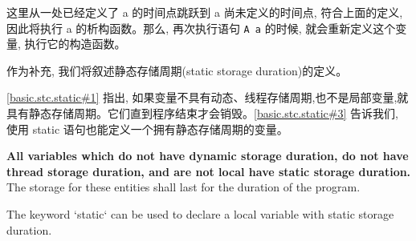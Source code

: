 \documentclass{article}
\begin{document}
	这里从一处已经定义了 a 的时间点跳跃到 a 尚未定义的时间点, 符合上面的定义, 因此将执行 a 的析构函数。那么, 再次执行语句 \verb|A a| 的时候, 就会重新定义这个变量, 执行它的构造函数。

	作为补充, 我们将叙述静态存储周期(static storage duration)的定义。
	
	\href{https://timsong-cpp.github.io/cppwp/n4659/basic.stc.static#1}	{[basic.stc.static\#1]} 指出, 如果变量不具有动态、线程存储周期,也不是局部变量,就具有静态存储周期。它们直到程序结束才会销毁。\href{https://timsong-cpp.github.io/cppwp/n4659/basic.stc.static#3}	{[basic.stc.static\#3]} 告诉我们, 使用 static 语句也能定义一个拥有静态存储周期的变量。

	\begin{lightgrayleftbar}
		\textbf{All variables which do not have dynamic storage duration, do not have thread storage duration, and are not local have static storage duration.} The storage for these entities shall last for the duration of the program.
		
		The keyword `static` can be used to declare a local variable with static storage duration. 

	\end{lightgrayleftbar}
	
	
\end{document}
